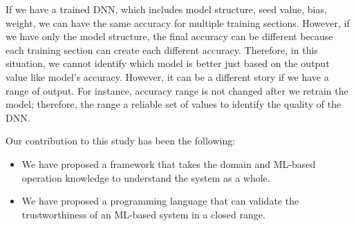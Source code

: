 If we have a trained DNN, which includes model structure, seed value, bias, weight, we can have the same accuracy for multiple training sections. However, if we have only the model structure, the final accuracy can be different because each training section can create each different accuracy. Therefore, in this situation, we cannot identify which model is better just based on the output value like model's accuracy. However, it can be a different story if we have a range of output. For instance, accuracy range is not changed after we retrain the model; therefore, the range a reliable set of values to identify the quality of the DNN.


Our contribution to this study has been the following:
\begin{itemize}
	\item We have proposed a framework that takes the domain and ML-based operation knowledge to understand the system as a whole.
	\item We have proposed a programming language that can validate the trustworthiness of an ML-based system in a closed range.
\end{itemize}
